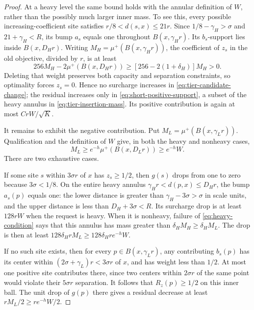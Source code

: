 \begin{proof}
At a heavy level the same bound holds with the annular definition of
\(W\), rather than the possibly much larger inner mass.  To see this,
every possible increasing-coefficient site satisfies
\(r/8<d(s,x)\le21r\).  Since
\(1/8-\gamma_H>\sigma\) and \(21+\gamma_H<R\), its bump \(a_s\)
equals one throughout \(B(x,\gamma_Hr)\).  Its \(b_s\)-support lies
inside \(B(x,D_Hr)\).  Writing
\(M_H=\mu^+(B(x,\gamma_Hr))\), the coefficient of \(z_s\) in the
old objective, divided by \(r\), is at least
\[
 256M_H-2\mu^+(B(x,D_Hr))
 \ge[256-2(1+\delta_H)]M_H>0.
\]
Deleting that weight preserves both capacity and separation constraints,
so optimality forces \(z_s=0\).  Hence no surcharge increases in
\eqref{eq:tier-candidate-change}; the residual increases only in
\eqref{eq:short-positive-support}, a subset of the heavy annulus in
\eqref{eq:tier-insertion-mass}.  Its positive contribution is again
at most \(CrW/\sqrt K\).

It remains to exhibit the negative contribution.  Put
\(M_L=\mu^+(B(x,\gamma_Lr))\).  Qualification and the definition
of \(W\) give, in both the heavy and nonheavy cases,
\begin{equation}\label{eq:insertion-inner-mass}
 M_L\ge e^{-h}\mu^+(B(x,D_Lr))\ge e^{-h}W.
\end{equation}
There are two exhaustive cases.

If some site \(s\) within \(3\sigma r\) of \(x\) has
\(z_s\ge1/2\), then \(g(s)\) drops from one to zero because
\(3\sigma<1/8\).  On the entire heavy annulus
\(\gamma_Hr<d(p,x)\le D_Hr\), the bump \(a_s(p)\) equals one:
the lower distance is greater than \(\gamma_H-3\sigma>\sigma\)
in scale units, and the upper distance is less than
\(D_H+3\sigma<R\).  Its surcharge drop is at least \(128rW\)
when the request is heavy.  When it is nonheavy, failure of
\eqref{eq:heavy-condition} says that this annulus has mass greater than
\(\delta_H M_H\ge\delta_H M_L\).  The drop is then at least
\(128\delta_HrM_L\ge128\delta_Hre^{-h}W\).

If no such site exists, then for every
\(p\in B(x,\gamma_Lr)\), any contributing \(b_s(p)\) has its
center within \((2\sigma+\gamma_L)r<3\sigma r\) of \(x\), and
has weight less than \(1/2\).  At most one positive site contributes
there, since two centers within \(2\sigma r\) of the same point
would violate their \(5\sigma r\) separation.  It follows that
\(R_z(p)\ge1/2\) on this inner ball.  The unit drop of \(g(p)\)
there gives a residual decrease at least
\(rM_L/2\ge re^{-h}W/2\).


\end{proof}
